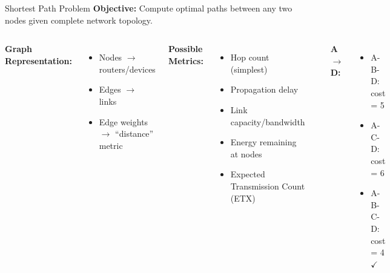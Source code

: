 \documentclass[aspectratio=169,11pt]{beamer}
\begin{document}
\begin{frame}{Shortest Path Problem}
    \textbf{Objective:} Compute optimal paths between any two nodes given complete network topology.
    
    \vspace{0.3cm}
    \begin{columns}
        \textbf{Graph Representation:}
        \begin{itemize}
            \item Nodes $\rightarrow$ routers/devices
            \item Edges $\rightarrow$ links
            \item Edge weights $\rightarrow$ ``distance'' metric
        \end{itemize}
        
        \vspace{0.3cm}
        \textbf{Possible Metrics:}
        \begin{itemize}
            \item Hop count (simplest)
            \item Propagation delay
            \item Link capacity/bandwidth
            \item Energy remaining at nodes
            \item Expected Transmission Count (ETX)
        \end{itemize}
        
        \begin{center}
        \end{center}
        
        \textbf{A $\rightarrow$ D:}
        \begin{itemize}
            \item A-B-D: cost = 5
            \item A-C-D: cost = 6
            \item A-B-C-D: cost = 4 $\checkmark$
        \end{itemize}
    \end{columns}
\end{frame}
\end{document}
